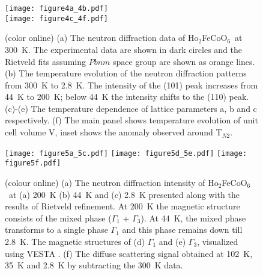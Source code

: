 \documentclass[12pt,twocolumns]{iopart}
\newcommand{\HFCO}{Ho$_2$FeCoO$_6$}
\begin{document}
\clearpage\newpage
\begin{figure}[!t]
	\centering
	\texttt{[image: figure4a\_4b.pdf]}
	\\
	\texttt{[image: figure4c\_4f.pdf]}
	\caption{(color online) (a) The neutron diffraction data of \HFCO\ at 300~K.
		The experimental data are shown in dark circles and the Rietveld fits assuming $Pbnm$ space group are shown as orange lines.
		(b) The temperature evolution of the neutron diffraction patterns from 300~K to 2.8~K.
		The intensity of the (101) peak increases from 44~K to 200~K; below 44~K the intensity shifts to the (110) peak. (c)-(e) The temperature dependence of lattice parameters a, b and c respectively. (f) The main panel shows temperature evolution of unit cell volume V, inset shows the anomaly observed around T$_{N2}$. }
	\label{fig:npd1}
\end{figure}

\clearpage\newpage
\begin{figure}[!t]
	\centering
	\texttt{[image: figure5a\_5c.pdf]}
	\texttt{[image: figure5d\_5e.pdf]}
	\texttt{[image: figure5f.pdf]}
		\caption{(colour online) (a) The neutron diffraction intensity of \HFCO\ at (a) 200~K (b) 44~K and (c) 2.8~K presented along with the results of Rietveld refinement. At 200~K the magnetic structure consists of the mixed phase ($\Gamma_1$ + $\Gamma_3$). At 44~K, the mixed phase transforms to a single phase $\Gamma_1$ and this phase remains down till 2.8~K. The magnetic structures of (d) $\Gamma_1$ and (e) $\Gamma_3$, visualized using VESTA \cite{momma2011vesta}. (f) The diffuse scattering signal obtained at 102~K, 35~K and 2.8~K by subtracting the 300~K data.}
	\label{fig:npd2}
\end{figure}
\end{document}

